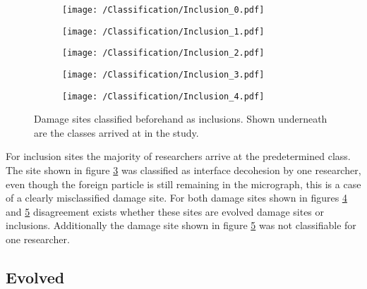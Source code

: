 \begin{figure}[H]
\begin{subfigure}{.2\textwidth}
\centering
  \texttt{[image: /Classification/Inclusion\_0.pdf]}
  \caption{}
  \label{fig:Inc1}
\end{subfigure}%
\begin{subfigure}{.2\textwidth}
\centering
  \texttt{[image: /Classification/Inclusion\_1.pdf]}
  \caption{}
  \label{fig:Inc2}
\end{subfigure}%
\centering
\begin{subfigure}{.2\textwidth}
\centering
  \texttt{[image: /Classification/Inclusion\_2.pdf]}
  \caption{}
  \label{fig:Inc3}
\end{subfigure}%
\begin{subfigure}{.2\textwidth}
\centering
  \texttt{[image: /Classification/Inclusion\_3.pdf]}
  \caption{}
  \label{fig:Inc4}
\end{subfigure}%
\begin{subfigure}{.2\textwidth}
\centering
  \texttt{[image: /Classification/Inclusion\_4.pdf]}
  \caption{}
  \label{fig:Inc5}
\end{subfigure}%
\caption{Damage sites classified beforehand as inclusions. Shown underneath are the classes arrived at in the study.}
\label{fig:InclusionStudy}
\end{figure}

For inclusion sites the majority of researchers arrive at the predetermined class. The site shown in figure \ref{fig:Inc3} was classified as interface decohesion by one researcher, even though the foreign particle is still remaining in the micrograph, this is a case of a clearly misclassified damage site. For both damage sites shown in figures \ref{fig:Inc4} and \ref{fig:Inc5} disagreement exists whether these sites are evolved damage sites or inclusions. Additionally the damage site shown in figure \ref{fig:Inc5} was not classifiable for one researcher.



\subsection{Evolved}

